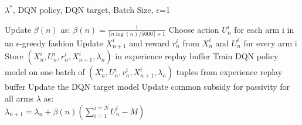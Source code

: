 \documentclass[12pt]{article}
\numberwithin{equation}{section}
\newcommand{\1}{\textbf{1}}
\begin{document}
\begin{algorithm}[H]
\caption{DQN Algorithm for Lagrangian Index}
\label{tab:DQN}
\begin{algorithmic}[1]
     $\lambda^*$, DQN policy, DQN target, Batch Size, $\epsilon$=1

        
        \State Update $\beta(n)$ as:
        $\beta(n)=\frac{1}{\lceil{n\log(n)/ 5000}\rceil+1}$
            \State Choose action $U_{n}^i$ for each arm i in an $\epsilon$-greedy fashion
            \State Update $X_{n+1}^i$ and reward $r_n^i$ from $X_{n}^i$ and $U_{n}^i$ for every arm i
            \State Store $(X_{n}^i,U_{n}^i,r_{n}^i,X_{n+1}^i,\lambda_n)$ in experience replay buffer
            \State Train DQN policy model on one batch of $(X_{n}^i,U_{n}^i,r_{n}^i,X_{n+1}^i,\lambda_n)$ tuples from experience replay buffer
        \EndFor
        \State Update the DQN target model
        \State Update common subsidy for passivity for all arms $\lambda$ as: \\ $\lambda_{n+1}=\lambda_n+\beta(n)\left(\sum\limits_{i=1}^{i=N}U_n^i-M\right)$
        

\end{algorithmic}
\end{algorithm}
\end{document}
